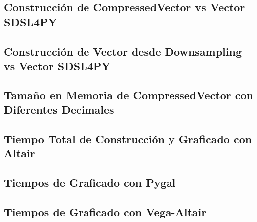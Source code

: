 \subsection{Construcción de CompressedVector vs Vector SDSL4PY}
\label{exp:build-cv-sdsl}

\subsection{Construcción de Vector desde Downsampling vs Vector SDSL4PY}
\label{exp:build-cvd-sdsl}

\subsection{Tamaño en Memoria de CompressedVector con Diferentes Decimales}
\label{exp:cvd-size-decimals}

\subsection{Tiempo Total de Construcción y Graficado con Altair}
\label{exp:altair-total-time}

\subsection{Tiempos de Graficado con Pygal}
\label{exp:pygal-time}

\subsection{Tiempos de Graficado con Vega-Altair}
\label{exp:altair-time}

